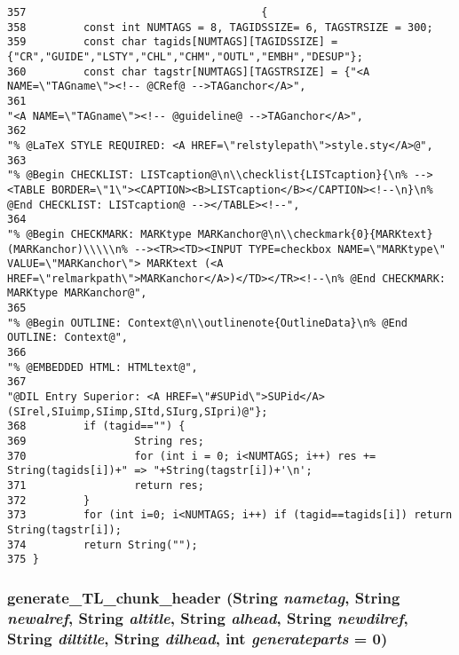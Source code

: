 \footnotesize\begin{verbatim}357                                     {
358         const int NUMTAGS = 8, TAGIDSSIZE= 6, TAGSTRSIZE = 300;
359         const char tagids[NUMTAGS][TAGIDSSIZE] = {"CR","GUIDE","LSTY","CHL","CHM","OUTL","EMBH","DESUP"};
360         const char tagstr[NUMTAGS][TAGSTRSIZE] = {"<A NAME=\"TAGname\"><!-- @CRef@ -->TAGanchor</A>",
361                                                                                 "<A NAME=\"TAGname\"><!-- @guideline@ -->TAGanchor</A>",
362                                                                                 "% @LaTeX STYLE REQUIRED: <A HREF=\"relstylepath\">style.sty</A>@",
363                                                                                 "% @Begin CHECKLIST: LISTcaption@\n\\checklist{LISTcaption}{\n% --><TABLE BORDER=\"1\"><CAPTION><B>LISTcaption</B></CAPTION><!--\n}\n% @End CHECKLIST: LISTcaption@ --></TABLE><!--",
364                                                                                 "% @Begin CHECKMARK: MARKtype MARKanchor@\n\\checkmark{0}{MARKtext} (MARKanchor)\\\\\n% --><TR><TD><INPUT TYPE=checkbox NAME=\"MARKtype\" VALUE=\"MARKanchor\"> MARKtext (<A HREF=\"relmarkpath\">MARKanchor</A>)</TD></TR><!--\n% @End CHECKMARK: MARKtype MARKanchor@",
365                                                                                 "% @Begin OUTLINE: Context@\n\\outlinenote{OutlineData}\n% @End OUTLINE: Context@",
366                                                                                 "% @EMBEDDED HTML: HTMLtext@",
367                                                                                 "@DIL Entry Superior: <A HREF=\"#SUPid\">SUPid</A> (SIrel,SIuimp,SIimp,SItd,SIurg,SIpri)@"};
368         if (tagid=="") {
369                 String res;
370                 for (int i = 0; i<NUMTAGS; i++) res += String(tagids[i])+" => "+String(tagstr[i])+'\n';
371                 return res;
372         }
373         for (int i=0; i<NUMTAGS; i++) if (tagid==tagids[i]) return String(tagstr[i]);
374         return String("");
375 }
\end{verbatim}\normalsize 
{}
\subsubsection{ generate\_\-TL\_\-chunk\_\-header ({\bf String} {\em nametag}, {\bf String} {\em newalref}, {\bf String} {\em altitle}, {\bf String} {\em alhead}, {\bf String} {\em newdilref}, {\bf String} {\em diltitle}, {\bf String} {\em dilhead}, int {\em generateparts} = 0)}\label{dil2al_8hh_a318}




